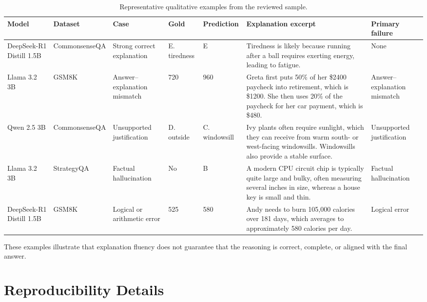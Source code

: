 \documentclass{article}
\begin{document}
\begin{table}[t]
\centering
\scriptsize
\caption{Representative qualitative examples from the reviewed sample.}
\label{tab:qualitative_examples}
\begin{tabular}{p{2.0cm}p{1.4cm}p{2.0cm}p{1.3cm}p{1.3cm}p{5.7cm}p{2.4cm}}
\toprule
\textbf{Model} &
\textbf{Dataset} &
\textbf{Case} &
\textbf{Gold} &
\textbf{Prediction} &
\textbf{Explanation excerpt} &
\textbf{Primary failure} \\
\midrule

DeepSeek-R1 Distill 1.5B &
CommonsenseQA &
Strong correct explanation &
E. tiredness &
E &
Tiredness is likely because running after a ball requires exerting energy,
leading to fatigue. &
None \\

Llama 3.2 3B &
GSM8K &
Answer--explanation mismatch &
720 &
960 &
Greta first puts 50\% of her \$2400 paycheck into retirement, which is
\$1200. She then uses 20\% of the paycheck for her car payment, which is
\$480. &
Answer--explanation mismatch \\

Qwen 2.5 3B &
CommonsenseQA &
Unsupported justification &
D. outside &
C. windowsill &
Ivy plants often require sunlight, which they can receive from warm
south- or west-facing windowsills. Windowsills also provide a stable
surface. &
Unsupported justification \\

Llama 3.2 3B &
StrategyQA &
Factual hallucination &
No &
B &
A modern CPU circuit chip is typically quite large and bulky, often
measuring several inches in size, whereas a house key is small and thin. &
Factual hallucination \\

DeepSeek-R1 Distill 1.5B &
GSM8K &
Logical or arithmetic error &
525 &
580 &
Andy needs to burn 105,000 calories over 181 days, which averages to
approximately 580 calories per day. &
Logical error \\
\bottomrule
\end{tabular}
\end{table}

These examples illustrate that explanation fluency does not guarantee that the
reasoning is correct, complete, or aligned with the final answer.

\section{Reproducibility Details}
\label{app:reproducibility}
\end{document}
